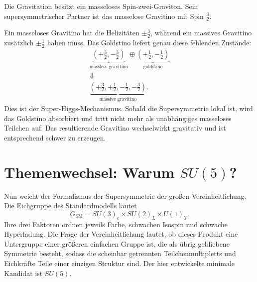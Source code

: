 Die Gravitation besitzt ein masseloses Spin-zwei-Graviton. Sein supersymmetrischer Partner ist das masselose Gravitino mit Spin \(\tfrac32\).

\begin{classroomqa}
\end{classroomqa}

Ein masseloses Gravitino hat die Helizitäten \(\pm\tfrac32\), während ein massives Gravitino zusätzlich \(\pm\tfrac12\) haben muss. Das Goldstino liefert genau diese fehlenden Zustände:
\begin{equation}
\begin{gathered}
\underbrace{\left(+\frac32,-\frac32\right)}_{\text{massless gravitino}}
\oplus
\underbrace{\left(+\frac12,-\frac12\right)}_{\text{goldstino}}\\
\Downarrow\\
\underbrace{\left(+\frac32,+\frac12,-\frac12,-\frac32\right)}_{\text{massive gravitino}}.
\end{gathered}
\label{eq:l9-super-higgs}
\end{equation}
Dies ist der Super-Higgs-Mechanismus. Sobald die Supersymmetrie lokal ist, wird das Goldstino absorbiert und tritt nicht mehr als unabhängiges masseloses Teilchen auf. Das resultierende Gravitino wechselwirkt gravitativ und ist entsprechend schwer zu erzeugen.

\section{Themenwechsel: Warum \texorpdfstring{\(SU(5)\)}{SU(5)}?}

Nun weicht der Formalismus der Supersymmetrie der großen Vereinheitlichung. Die Eichgruppe des Standardmodells lautet
\begin{equation}
G_{\mathrm{SM}}
=SU(3)_c\times SU(2)_L\times U(1)_Y.
\label{eq:l9-sm-group}
\end{equation}
Ihre drei Faktoren ordnen jeweils Farbe, schwachen Isospin und schwache Hyperladung. Die Frage der Vereinheitlichung lautet, ob dieses Produkt eine Untergruppe einer größeren einfachen Gruppe ist, die als übrig gebliebene Symmetrie besteht, sodass die scheinbar getrennten Teilchenmultipletts und Eichkräfte Teile einer einzigen Struktur sind. Der hier entwickelte minimale Kandidat ist \(SU(5)\).

